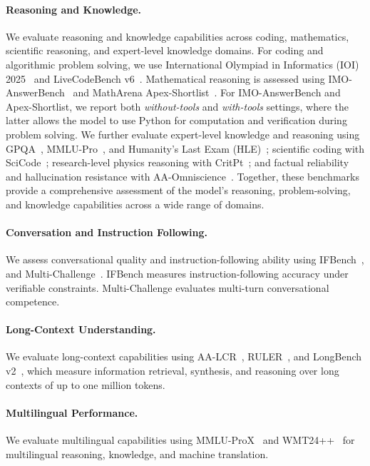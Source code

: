 \paragraph{Reasoning and Knowledge.}
We evaluate reasoning and knowledge capabilities across coding, mathematics, scientific reasoning, and expert-level knowledge domains. For coding and algorithmic problem solving, we use International Olympiad in Informatics (IOI) 2025~\citep{ioi2025} and LiveCodeBench v6~\citep{jain2024livecodebench}. Mathematical reasoning is assessed using IMO-AnswerBench~\citep{luong2025towards} and MathArena Apex-Shortlist~\citep{dekoninck2026matharena}. For IMO-AnswerBench and Apex-Shortlist, we report both \emph{without-tools} and \emph{with-tools} settings, where the latter allows the model to use Python for computation and verification during problem solving. We further evaluate expert-level knowledge and reasoning using GPQA~\citep{rein2023gpqa}, MMLU-Pro~\citep{wang2024mmlupro}, and Humanity's Last Exam (HLE)~\citep{phan2025humanitysexam}; scientific coding with SciCode~\citep{tian2024scicoderesearchcodingbenchmark}; research-level physics reasoning with CritPt~\citep{zhu2025critpt}; and factual reliability and hallucination resistance with AA-Omniscience~\citep{jackson2025aaomniscience}. Together, these benchmarks provide a comprehensive assessment of the model's reasoning, problem-solving, and knowledge capabilities across a wide range of domains.


\paragraph{Conversation and Instruction Following.}
We assess conversational quality and instruction-following ability using IFBench~\citep{pyatkin2025generalizing}, and Multi-Challenge~\citep{deshpande2025multichallenge}. IFBench measures instruction-following accuracy under verifiable constraints. Multi-Challenge evaluates multi-turn conversational competence.

\paragraph{Long-Context Understanding.}
We evaluate long-context capabilities using AA-LCR~\citep{artificialanalysis2025lcr}, RULER~\citep{hsieh2024ruler}, and LongBench v2~\citep{bai2025longbenchv2}, which measure information retrieval, synthesis, and reasoning over long contexts of up to one million tokens.

\paragraph{Multilingual Performance.}
We evaluate multilingual capabilities using MMLU-ProX~\citep{xuan2025mmluprox} and WMT24++~\citep{deutsch2025wmt24pp} for multilingual reasoning, knowledge, and machine translation.

